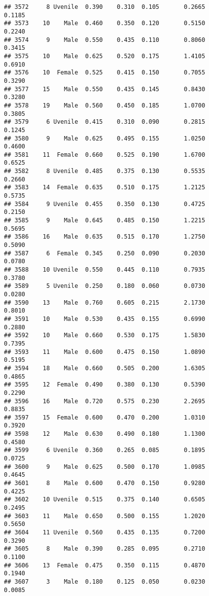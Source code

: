 \documentclass[
]{article}
\begin{document}
\begin{verbatim}
## 3572     8 Uvenile  0.390    0.310  0.105       0.2665         0.1185
## 3573    10    Male  0.460    0.350  0.120       0.5150         0.2240
## 3574     9    Male  0.550    0.435  0.110       0.8060         0.3415
## 3575    10    Male  0.625    0.520  0.175       1.4105         0.6910
## 3576    10  Female  0.525    0.415  0.150       0.7055         0.3290
## 3577    15    Male  0.550    0.435  0.145       0.8430         0.3280
## 3578    19    Male  0.560    0.450  0.185       1.0700         0.3805
## 3579     6 Uvenile  0.415    0.310  0.090       0.2815         0.1245
## 3580     9    Male  0.625    0.495  0.155       1.0250         0.4600
## 3581    11  Female  0.660    0.525  0.190       1.6700         0.6525
## 3582     8 Uvenile  0.485    0.375  0.130       0.5535         0.2660
## 3583    14  Female  0.635    0.510  0.175       1.2125         0.5735
## 3584     9 Uvenile  0.455    0.350  0.130       0.4725         0.2150
## 3585     9    Male  0.645    0.485  0.150       1.2215         0.5695
## 3586    16    Male  0.635    0.515  0.170       1.2750         0.5090
## 3587     6  Female  0.345    0.250  0.090       0.2030         0.0780
## 3588    10 Uvenile  0.550    0.445  0.110       0.7935         0.3780
## 3589     5 Uvenile  0.250    0.180  0.060       0.0730         0.0280
## 3590    13    Male  0.760    0.605  0.215       2.1730         0.8010
## 3591    10    Male  0.530    0.435  0.155       0.6990         0.2880
## 3592    10    Male  0.660    0.530  0.175       1.5830         0.7395
## 3593    11    Male  0.600    0.475  0.150       1.0890         0.5195
## 3594    18    Male  0.660    0.505  0.200       1.6305         0.4865
## 3595    12  Female  0.490    0.380  0.130       0.5390         0.2290
## 3596    16    Male  0.720    0.575  0.230       2.2695         0.8835
## 3597    15  Female  0.600    0.470  0.200       1.0310         0.3920
## 3598    12    Male  0.630    0.490  0.180       1.1300         0.4580
## 3599     6 Uvenile  0.360    0.265  0.085       0.1895         0.0725
## 3600     9    Male  0.625    0.500  0.170       1.0985         0.4645
## 3601     8    Male  0.600    0.470  0.150       0.9280         0.4225
## 3602    10 Uvenile  0.515    0.375  0.140       0.6505         0.2495
## 3603    11    Male  0.650    0.500  0.155       1.2020         0.5650
## 3604    11 Uvenile  0.560    0.435  0.135       0.7200         0.3290
## 3605     8    Male  0.390    0.285  0.095       0.2710         0.1100
## 3606    13  Female  0.475    0.350  0.115       0.4870         0.1940
## 3607     3    Male  0.180    0.125  0.050       0.0230         0.0085

\end{verbatim}
\end{document}
